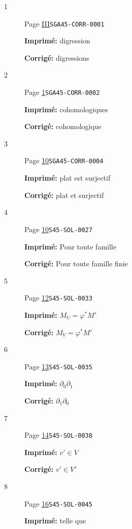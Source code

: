 \documentclass[oneside]{book}
\theoremstyle{sga-source}
\theoremstyle{sga-source-dash}
\theoremstyle{sga-source-dotdash}
\theoremstyle{sga-source-number-note-dash}
\theoremstyle{sga-source-note-number-dotdash}
\theoremstyle{sga-source-example-dotdash}
\theoremstyle{sga-source-inline-number}
\theoremstyle{sga-source-bare-number}
\theoremstyle{sga-source}
\begin{document}
\begin{description}
\item[\hypertarget{apparatus:FR-0001}{1}] Page \hyperlink{printpage:fr:III}{III}\quad\texttt{SGA45-CORR-0001}
\par\noindent\textbf{Imprimé:} digression
\par\noindent\textbf{Corrigé:} digressions
\smallskip
\item[\hypertarget{apparatus:FR-0002}{2}] Page \hyperlink{printpage:fr:1}{1}\quad\texttt{SGA45-CORR-0002}
\par\noindent\textbf{Imprimé:} cohomologiques
\par\noindent\textbf{Corrigé:} cohomologique
\smallskip
\item[\hypertarget{apparatus:FR-0003}{3}] Page \hyperlink{printpage:fr:10}{10}\quad\texttt{SGA45-CORR-0004}
\par\noindent\textbf{Imprimé:} plat est surjectif
\par\noindent\textbf{Corrigé:} plat et surjectif
\smallskip
\item[\hypertarget{apparatus:FR-0004}{4}] Page \hyperlink{printpage:fr:10}{10}\quad\texttt{S45-SOL-0027}
\par\noindent\textbf{Imprimé:} Pour toute famille
\par\noindent\textbf{Corrigé:} Pour toute famille finie
\smallskip
\item[\hypertarget{apparatus:FR-0005}{5}] Page \hyperlink{printpage:fr:12}{12}\quad\texttt{S45-SOL-0033}
\par\noindent\textbf{Imprimé:} \(M_U=\varphi^* M'\)
\par\noindent\textbf{Corrigé:} \(M_V=\varphi^* M'\)
\smallskip
\item[\hypertarget{apparatus:FR-0006}{6}] Page \hyperlink{printpage:fr:13}{13}\quad\texttt{S45-SOL-0035}
\par\noindent\textbf{Imprimé:} \(\partial_0\partial_1\)
\par\noindent\textbf{Corrigé:} \(\partial_1\partial_0\)
\smallskip
\item[\hypertarget{apparatus:FR-0007}{7}] Page \hyperlink{printpage:fr:14}{14}\quad\texttt{S45-SOL-0038}
\par\noindent\textbf{Imprimé:} \(v'\in V\)
\par\noindent\textbf{Corrigé:} \(v'\in V'\)
\smallskip
\item[\hypertarget{apparatus:FR-0008}{8}] Page \hyperlink{printpage:fr:16}{16}\quad\texttt{S45-SOL-0045}
\par\noindent\textbf{Imprimé:} telle que

\end{description}
\end{document}

